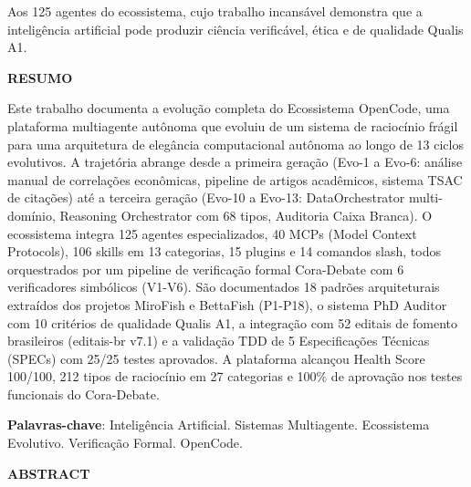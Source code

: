 \documentclass[12pt,a4paper,sumario=tradicional]{abntex2}
\begin{document}
Aos 125 agentes do ecossistema, cujo trabalho incansável demonstra que a inteligência artificial pode produzir ciência verificável, ética e de qualidade Qualis A1.

\newpage
\begin{center}
\textbf{RESUMO}
\end{center}

Este trabalho documenta a evolução completa do Ecossistema OpenCode, uma plataforma multiagente autônoma que evoluiu de um sistema de raciocínio frágil para uma arquitetura de elegância computacional autônoma ao longo de 13 ciclos evolutivos. A trajetória abrange desde a primeira geração (Evo-1 a Evo-6: análise manual de correlações econômicas, pipeline de artigos acadêmicos, sistema TSAC de citações) até a terceira geração (Evo-10 a Evo-13: DataOrchestrator multi-domínio, Reasoning Orchestrator com 68 tipos, Auditoria Caixa Branca). O ecossistema integra 125 agentes especializados, 40 MCPs (Model Context Protocols), 106 skills em 13 categorias, 15 plugins e 14 comandos slash, todos orquestrados por um pipeline de verificação formal Cora-Debate com 6 verificadores simbólicos (V1-V6). São documentados 18 padrões arquiteturais extraídos dos projetos MiroFish e BettaFish (P1-P18), o sistema PhD Auditor com 10 critérios de qualidade Qualis A1, a integração com 52 editais de fomento brasileiros (editais-br v7.1) e a validação TDD de 5 Especificações Técnicas (SPECs) com 25/25 testes aprovados. A plataforma alcançou Health Score 100/100, 212 tipos de raciocínio em 27 categorias e 100\% de aprovação nos testes funcionais do Cora-Debate.

\vspace{0.5cm}
\textbf{Palavras-chave}: Inteligência Artificial. Sistemas Multiagente. Ecossistema Evolutivo. Verificação Formal. OpenCode.

\newpage
\begin{center}
\textbf{ABSTRACT}
\end{center}
\end{document}
